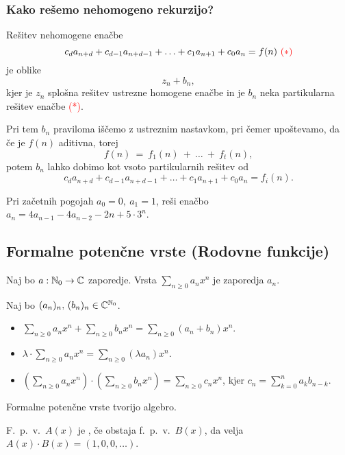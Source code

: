 \subsubsection*{Kako rešemo nehomogeno rekurzijo?}
Rešitev nehomogene enačbe 
$$c_da_{n+d} + c_{d-1}a_{n+d-1} + \ldots + c_1 a _{n+1} + c_0 a_n = f(n) \ \textcolor{red}{(*)}$$
je oblike 
$$z_n + b_n,$$
kjer je $z_n$ splošna rešitev ustrezne homogene enačbe in je $b_n$ neka partikularna rešitev enačbe \textcolor{red}{(*)}.

Pri tem $b_n$ praviloma iščemo z ustreznim nastavkom, pri čemer upoštevamo, da če je $f(n)$ aditivna, torej $$f(n)~=~f_1(n)~+~\ldots~+~f_t(n),$$ potem $b_n$ lahko dobimo kot vsoto partikularnih rešitev od $$c_da_{n+d} + c_{d-1}a_{n+d-1} + \ldots + c_1 a _{n+1} + c_0 a_n = f_i(n).$$

\begin{primer}
    Pri začetnih pogojah $a_0 = 0, \ a_1 = 1$, reši enačbo $a_n = 4a_{n-1} - 4a_{n-2} - 2n + 5 \cdot 3^n$.
\end{primer}

\subsection{Formalne potenčne vrste (Rodovne funkcije)}
\begin{definicija}
    Naj bo $a: \mathbb{N}_0 \to \mathbb{C}$ zaporedje. Vrsta $\sum_{n \geq 0}a_n x^n$ je  zaporedja $a_n$.
\end{definicija}

\begin{definicija}
    Naj bo $(a_n)_n, \, (b_n)_n \in \mathbb{C}^{\mathbb{N}_0}$.
    \begin{itemize}
        \item $\sum_{n \geq 0}a_n x^n + \sum_{n \geq 0}b_n x^n = \sum_{n \geq 0}(a_n + b_n) x^n$.
        \item $\lambda \cdot \sum_{n \geq 0}a_n x^n = \sum_{n \geq 0}(\lambda a_n) x^n$.
        \item $(\sum_{n \geq 0}a_n x^n) \cdot (\sum_{n \geq 0}b_n x^n) = \sum_{n \geq 0}c_n x^n$, kjer $c_n = \sum_{k=0}^{n}a_kb_{n-k}$.
    \end{itemize}
\end{definicija}

\begin{opomba}
    Formalne potenčne vrste tvorijo algebro.
\end{opomba}

\begin{definicija}
    F.\ p.\ v.\ $A(x)$ je , če obstaja f.\ p.\ v.\ $B(x)$, da velja $A(x) \cdot B(x) = (1, 0, 0, \ldots)$.
\end{definicija}

